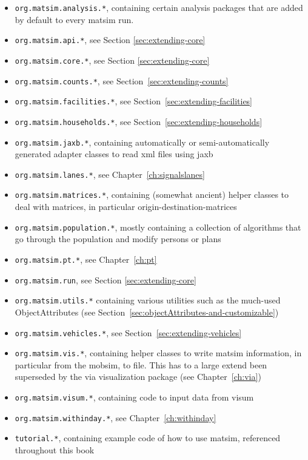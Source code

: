 \begin{itemize}\styleItemize
\item \lstinline{org.matsim.analysis.*}, containing certain analysis packages that are added by default to every \gls{matsim} run.
\item \lstinline{org.matsim.api.*}, see Section \ref{sec:extending-core}
\item \lstinline{org.matsim.core.*}, see Section \ref{sec:extending-core}
\item \lstinline{org.matsim.counts.*}, see Section~\ref{sec:extending-counts}
\item \lstinline{org.matsim.facilities.*}, see Section~\ref{sec:extending-facilities}
\item \lstinline{org.matsim.households.*}, see Section~\ref{sec:extending-households}
\item \lstinline{org.matsim.jaxb.*}, containing automatically or semi-automatically generated adapter classes to read \gls{xml} files using \gls{jaxb} 
\item \lstinline{org.matsim.lanes.*}, see Chapter~\ref{ch:signalslanes}
\item \lstinline{org.matsim.matrices.*}, containing  (somewhat ancient) helper classes to deal with matrices, in particular origin-destination-matrices
\item \lstinline{org.matsim.population.*}, mostly containing a collection of algorithms that go through the population and modify persons or plans
\item \lstinline{org.matsim.pt.*}, see Chapter~\ref{ch:pt}
\item \lstinline{org.matsim.run}, see Section \ref{sec:extending-core}
\item \lstinline{org.matsim.utils.*} containing various utilities such as the much-used ObjectAttributes
(see Section~\ref{sec:objectAttributes-and-customizable})
\item \lstinline{org.matsim.vehicles.*}, see Section~\ref{sec:extending-vehicles}
\item \lstinline{org.matsim.vis.*}, containing helper classes to write \gls{matsim} information, in particular from the \gls{mobsim}, to file.  This has to a large extend been superseded by the \gls{via} visualization package (see Chapter~\ref{ch:via})
\item \lstinline{org.matsim.visum.*}, containing code to input data from \gls{visum}
\item \lstinline{org.matsim.withinday.*}, see Chapter~\ref{ch:withinday}
\item \lstinline{tutorial.*}, containing example code of how to use \gls{matsim}, referenced throughout this book
\end{itemize}

